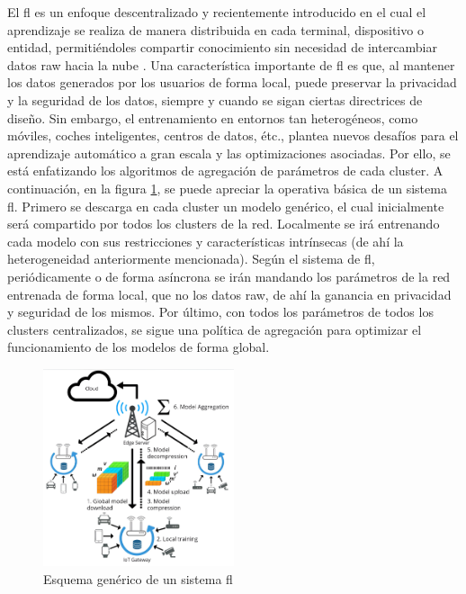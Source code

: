 El \gls{fl} es un enfoque descentralizado y recientemente introducido en el cual el aprendizaje se realiza de manera distribuida en cada terminal, dispositivo o entidad, permitiéndoles compartir conocimiento sin necesidad de intercambiar datos raw hacia la nube \cite{mcmahan2017communication}. Una característica importante de \gls{fl} es que, al mantener los datos generados por los usuarios de forma local, puede preservar la privacidad y la seguridad de los datos, siempre y cuando se sigan ciertas directrices de diseño. Sin embargo, el entrenamiento en entornos tan heterogéneos, como móviles, coches inteligentes, centros de datos, étc., plantea nuevos desafíos para el aprendizaje automático a gran escala y las optimizaciones asociadas. Por ello, se está enfatizando los algoritmos de agregación de parámetros de cada cluster. A continuación, en la figura \ref{fig:fl}, se puede apreciar la operativa básica de un sistema \gls{fl}. Primero se descarga en cada cluster un modelo genérico, el cual inicialmente será compartido por todos los clusters de la red. Localmente se irá entrenando cada modelo con sus restricciones y características intrínsecas (de ahí la heterogeneidad anteriormente mencionada). Según el sistema de \gls{fl}, periódicamente o de forma asíncrona se irán mandando los parámetros de la red entrenada de forma local, que no los datos raw, de ahí la ganancia en privacidad y seguridad de los mismos. Por último, con todos los parámetros de todos los clusters centralizados, se sigue una política de agregación para optimizar el funcionamiento de los modelos de forma global.\\

\begin{figure}[h!]
    \centering
    \includegraphics[width=0.5\textwidth]{archivos/img/teoria/fl.jpg}
    \caption{Esquema genérico de un sistema \gls{fl} \cite{mills2019communication}}
    \label{fig:fl}
\end{figure}


